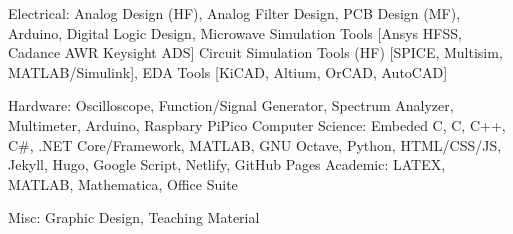 

\begin{cvskills}

  \cvskill
    {Electrical:} %
    {Analog Design (HF), Analog Filter Design, PCB Design (MF), Arduino, Digital Logic Design, Microwave Simulation Tools [Ansys HFSS, Cadance AWR Keysight ADS] Circuit Simulation Tools (HF) [SPICE, Multisim, MATLAB/Simulink], EDA Tools [KiCAD, Altium, OrCAD, AutoCAD]} %

\cvskill
    {Hardware:}
    {Oscilloscope, Function/Signal Generator, Spectrum Analyzer, Multimeter, Arduino, Raspbary PiPico }
  \cvskill
    {Computer Science:} %
    {Embeded C, C, C++, C\#, .NET Core/Framework, MATLAB, GNU Octave, Python, HTML/CSS/JS, Jekyll, Hugo, Google Script, Netlify, GitHub Pages} %
  \cvskill
    {Academic:} %
    {LATEX, MATLAB, Mathematica, Office Suite} %


  \cvskill
    {Misc:} %
    {Graphic Design, Teaching Material} %
\end{cvskills}